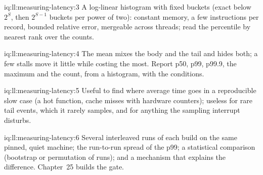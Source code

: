 \begin{solution}{iq:ll:measuring-latency:3}
A log-linear histogram with fixed buckets (exact below $2^S$, then $2^{S-1}$ buckets per power of two): constant memory,
a few instructions per record, bounded relative error, mergeable across threads; read the percentile by nearest rank
over the counts.
\end{solution}

\begin{solution}{iq:ll:measuring-latency:4}
The mean mixes the body and the tail and hides both; a few stalls move it little while costing the most. Report p50,
p99, p99.9, the maximum and the count, from a histogram, with the conditions.
\end{solution}

\begin{solution}{iq:ll:measuring-latency:5}
Useful to find where average time goes in a reproducible slow case (a hot function, cache misses with hardware
counters); useless for rare tail events, which it rarely samples, and for anything the sampling interrupt disturbs.
\end{solution}

\begin{solution}{iq:ll:measuring-latency:6}
Several interleaved runs of each build on the same pinned, quiet machine; the run-to-run spread of the p99; a
statistical comparison (bootstrap or permutation of runs); and a mechanism that explains the difference. Chapter~25 builds
the gate.
\end{solution}
